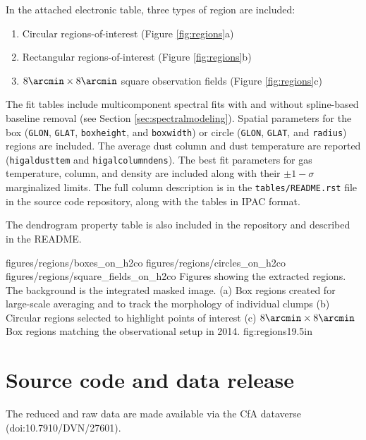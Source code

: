 In the attached electronic table, three types of region are included: 
\begin{enumerate}
    \item Circular regions-of-interest (Figure \ref{fig:regions}a)
    \item Rectangular regions-of-interest (Figure \ref{fig:regions}b)
    \item $8\arcmin \times 8\arcmin$ square observation fields (Figure \ref{fig:regions}c)
\end{enumerate}
The fit tables include multicomponent spectral fits with and without
spline-based baseline removal (see Section \ref{sec:spectralmodeling}).
Spatial parameters for the box (\texttt{GLON}, \texttt{GLAT},
\texttt{boxheight}, and \texttt{boxwidth}) or circle (\texttt{GLON},
\texttt{GLAT}, and \texttt{radius}) regions are included.  The average dust
column and dust temperature are reported (\texttt{higaldusttem} and
\texttt{higalcolumndens}).  The best fit parameters for gas temperature, \para
column, and \hh density are included along with their $\pm1-\sigma$ marginalized
limits.  The full column description is in the \texttt{tables/README.rst} file
in the source code repository, along with the tables in IPAC format.

The dendrogram property table is also included in the repository and described
in the README.

\RotFigureThreeAA
{figures/regions/boxes_on_h2co}
{figures/regions/circles_on_h2co}
{figures/regions/square_fields_on_h2co}
{Figures showing the extracted regions.  The background is the integrated
masked \para \threeohthree image. (a) Box regions created for large-scale averaging
and to track the morphology of individual clumps  (b) Circular regions selected
to highlight points of interest (c) $8\arcmin \times 8\arcmin$ Box regions
matching the observational setup in 2014.}
{fig:regions}{1}{9.5in}

\section{Source code and data release}
The reduced and raw data are made available via the CfA dataverse
(doi:10.7910/DVN/27601).

